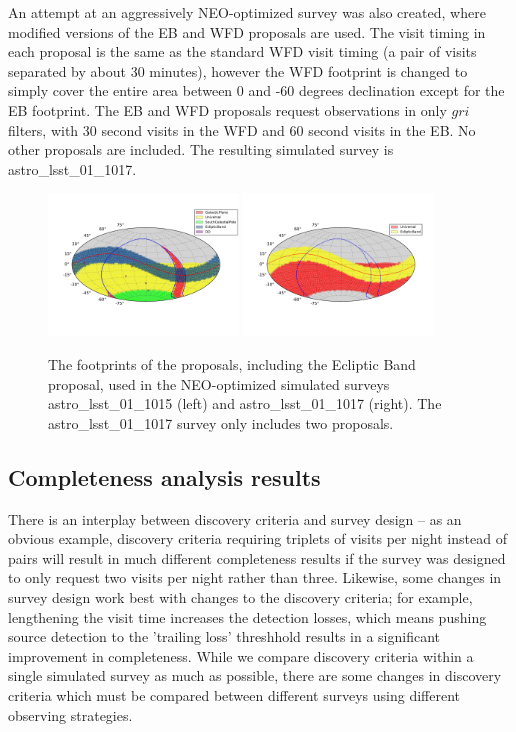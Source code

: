 An attempt at an aggressively NEO-optimized survey was also created, where modified versions of the EB and WFD proposals are used. The visit timing in each proposal is the same as the standard WFD visit timing (a pair of visits separated by about 30 minutes), however the WFD footprint is changed to simply cover the entire area between 0 and -60 degrees declination except for the EB footprint. The EB and WFD proposals request observations in only $gri$ filters, with 30 second visits in the WFD and 60 second visits in the EB. No other proposals are included. The resulting simulated survey is astro\_lsst\_01\_1017. 

\begin{figure}
\centering
\includegraphics[width=0.45\textwidth]{figures/astro_lsst_01_1015_proposal_footprint}
\includegraphics[width=0.45\textwidth]{figures/astro_lsst_01_1017_proposal_footprint}
\caption{The footprints of the proposals, including the Ecliptic Band proposal, used in the NEO-optimized simulated surveys astro\_lsst\_01\_1015 (left) and astro\_lsst\_01\_1017 (right). The astro\_lsst\_01\_1017 survey only includes two proposals.
\label{fig:neo_footprints}}
\end{figure}


\subsection{Completeness analysis results}

There is an interplay between discovery criteria and survey design -- as an obvious example, discovery criteria requiring triplets of visits per night instead of pairs will result in much different completeness results if the survey was designed to only request two visits per night rather than three. Likewise, some changes in survey design work best with changes to the discovery criteria; for example, lengthening the visit time increases the detection losses, which means pushing source detection to the 'trailing loss' threshhold results in a significant improvement in completeness. While we compare discovery criteria within a single simulated survey as much as possible, there are some changes in discovery criteria which must be compared between different surveys using different observing strategies.  

